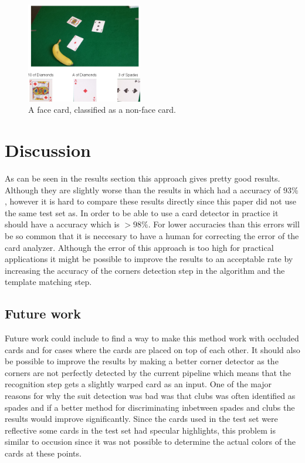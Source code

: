 \documentclass[journal,twoside]{IEEEtran}
\begin{document}
\begin{figure}[placement h]
\centering
\includegraphics[width=0.45\textwidth]{images/testResults/4.png}
\caption{A face card, classified as a non-face card.}
\label{fig:error4}
\end{figure}


\section{Discussion}

As can be seen in the results section this approach gives pretty good results. Although they are slightly worse than the results in \cite{PokerVision} which had a accuracy of $93\%$, however it is hard to compare these results directly since this paper did not use the same test set as\cite{PokerVision}. In order to be able to use a card detector in practice it should have a accuracy which is $>98\%$. For lower accuracies than this errors will be so common that it is neccesary to have a human for correcting the error of the card analyzer.
Although the error of this approach is too high for practical applications it might be possible to improve the results to an acceptable rate by increasing the accuracy of the corners detection step in the algorithm and the template matching step.


\subsection{Future work}

Future work could include to find a way to make this method work with occluded cards and for cases where the cards are placed on top of each other. It should also be possible to improve the results by making a better corner detector as the corners are not perfectly detected by the current pipeline which means that the recognition step gets a slightly warped card as an input. One of the major reasons for why the suit detection was bad was that clubs was often identified as spades and if a better method for discriminating inbetween spades and clubs the results would improve significantly. Since the cards used in the test set were reflective some cards in the test set had specular highlights, this problem is similar to occusion since it was not possible to determine the actual colors of the cards at these points.
\end{document}
